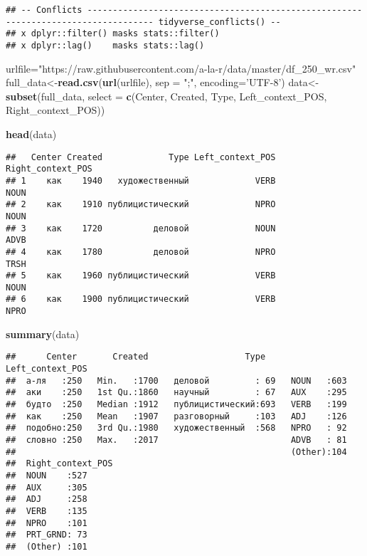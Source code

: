 \documentclass[
]{article}
\newenvironment{Shaded}{\begin{snugshade}}{\end{snugshade}}
\newcommand{\DataTypeTok}[1]{\textcolor[rgb]{0.13,0.29,0.53}{#1}}
\newcommand{\KeywordTok}[1]{\textcolor[rgb]{0.13,0.29,0.53}{\textbf{#1}}}
\newcommand{\NormalTok}[1]{#1}
\newcommand{\StringTok}[1]{\textcolor[rgb]{0.31,0.60,0.02}{#1}}
\begin{document}
\begin{verbatim}
## -- Conflicts ----------------------------------------------------------------------------------- tidyverse_conflicts() --
## x dplyr::filter() masks stats::filter()
## x dplyr::lag()    masks stats::lag()
\end{verbatim}

\begin{Shaded}
\begin{Highlighting}[]
\NormalTok{urlfile=}\StringTok{"https://raw.githubusercontent.com/a-la-r/data/master/df_250_wr.csv"}
\NormalTok{full_data<-}\KeywordTok{read.csv}\NormalTok{(}\KeywordTok{url}\NormalTok{(urlfile), }\DataTypeTok{sep =} \StringTok{";"}\NormalTok{, }\DataTypeTok{encoding=}\StringTok{'UTF-8'}\NormalTok{)}
\NormalTok{data<-}\StringTok{ }\KeywordTok{subset}\NormalTok{(full_data, }\DataTypeTok{select =} \KeywordTok{c}\NormalTok{(Center, Created, Type, Left_context_POS, Right_context_POS))}
\end{Highlighting}
\end{Shaded}

\begin{Shaded}
\begin{Highlighting}[]
\KeywordTok{head}\NormalTok{(data)}
\end{Highlighting}
\end{Shaded}

\begin{verbatim}
##   Center Created             Type Left_context_POS Right_context_POS
## 1    как    1940   художественный             VERB              NOUN
## 2    как    1910 публицистический             NPRO              NOUN
## 3    как    1720          деловой             NOUN              ADVB
## 4    как    1780          деловой             NPRO              TRSH
## 5    как    1960 публицистический             VERB              NOUN
## 6    как    1900 публицистический             VERB              NPRO
\end{verbatim}

\begin{Shaded}
\begin{Highlighting}[]
\KeywordTok{summary}\NormalTok{(data)}
\end{Highlighting}
\end{Shaded}

\begin{verbatim}
##      Center       Created                   Type     Left_context_POS
##  а-ля   :250   Min.   :1700   деловой         : 69   NOUN   :603     
##  аки    :250   1st Qu.:1860   научный         : 67   AUX    :295     
##  будто  :250   Median :1912   публицистический:693   VERB   :199     
##  как    :250   Mean   :1907   разговорный     :103   ADJ    :126     
##  подобно:250   3rd Qu.:1980   художественный  :568   NPRO   : 92     
##  словно :250   Max.   :2017                          ADVB   : 81     
##                                                      (Other):104     
##  Right_context_POS
##  NOUN    :527     
##  AUX     :305     
##  ADJ     :258     
##  VERB    :135     
##  NPRO    :101     
##  PRT_GRND: 73     
##  (Other) :101
\end{verbatim}
\end{document}
